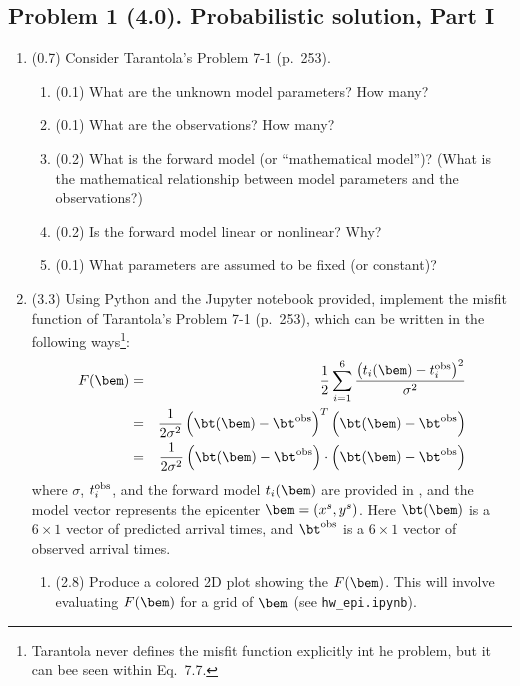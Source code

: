 \documentclass[11pt,titlepage,fleqn]{article}
\begin{document}

\pagebreak
\subsection*{Problem 1 (4.0). Probabilistic solution, Part I}

\begin{enumerate}
\item (0.7) Consider Tarantola's Problem 7-1 (p.~253).
%
\begin{enumerate}
\item (0.1) What are the unknown model parameters? How many?
\item (0.1) What are the observations? How many?
\item (0.2) What is the forward model (or ``mathematical model'')? (What is the mathematical relationship between model parameters and the observations?)
\item (0.2) Is the forward model linear or nonlinear? Why?
\item (0.1) What parameters are assumed to be fixed (or constant)?
\end{enumerate}


\item (3.3) Using Python and the Jupyter notebook provided, implement the misfit function of Tarantola's Problem 7-1 (p.~253), which can be written in the following ways\footnote{Tarantola never defines the misfit function explicitly int he problem, but it can bee seen within Eq.~7.7.}:
%
\begin{eqnarray}
F(\bem) &=& \frac{1}{2} \sum_{i=1}^6 \frac{\left(t_i(\bem) - t_i^{\rm obs}\right)^2}{\sigma^2}
\\
&=& \frac{1}{2\sigma^2} \left(\bt(\bem) - \bt^{\rm obs}\right)^T \left(\bt(\bem) - \bt^{\rm obs}\right)
\\
&=& \frac{1}{2\sigma^2} \left(\bt(\bem) - \bt^{\rm obs}\right) \cdot \left(\bt(\bem) - \bt^{\rm obs}\right)
\end{eqnarray}
%
where $\sigma$, $t_i^{\rm obs}$, and the forward model $t_i(\bem)$ are provided in \citet{Tarantola2005}, and the model vector represents the epicenter $\bem = (x^s,y^s)$. Here $\bt(\bem)$ is a $6 \times 1$ vector of predicted arrival times, and $\bt^{\rm obs}$ is a $6 \times 1$ vector of observed arrival times.

\begin{enumerate}
\item (2.8) Produce a colored 2D plot showing the $F(\bem)$. This will involve evaluating $F(\bem)$ for a grid of $\bem$ (see \verb+hw_epi.ipynb+).


\end{enumerate}
\end{enumerate}
\end{document}
